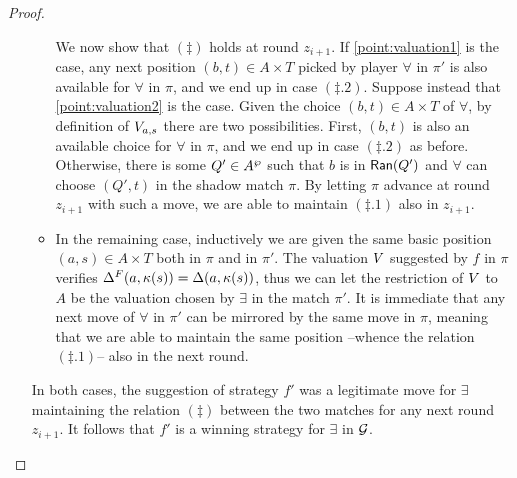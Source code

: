 \begin{proof}
\begin{enumerate}
\begin{itemize}
      We now show that $(\ddag)$ holds at round $z_{i+1}$. If \eqref{point:valuation1} is the case, any next position $(b,t)\in A \times T$ picked by player $\forall$ in $\pi'$ is also available for $\forall$ in $\pi$, and we end up in case $(\ddag .2)$. Suppose instead that \eqref{point:valuation2} is the case. Given the choice $(b,t) \in A \times T$ of $\forall$, by definition of $V_{a,s}$ there are two possibilities. First, $(b,t)$ is also an available choice for $\forall$ in $\pi$, and we end up in case $(\ddag .2)$ as before. Otherwise, there is some $Q' \in A^{\wp}$ such that $b$ is in $\mathsf{Ran}(Q')$ and $\forall$ can choose $(Q',t)$ in the shadow match $\pi$. By letting $\pi$ advance at round $z_{i+1}$ with such a move, we are able to maintain $(\ddag .1)$ also in $z_{i+1}$.
  \item In the remaining case, inductively we are given the same basic position $(a,s) \in A\times T$ both in $\pi$ and in $\pi'$. The valuation $V$ suggested by $f$ in $\pi$ verifies $\Delta^{F}(a,\kappa(s)) = \Delta(a,\kappa(s))$, thus we can let the restriction of $V$ to $A$ be the valuation chosen by $\exists$ in the match $\pi'$. It is immediate that any next move of $\forall$ in $\pi'$ can be mirrored by the same move in $\pi$, meaning that we are able to maintain the same position --whence the relation $(\ddag.1)$-- also in the next round.
\end{itemize}
In both cases, the suggestion of strategy $f'$ was a legitimate move for $\exists$ maintaining the relation $(\ddag)$ between the two matches for any next round $z_{i+1}$. It follows that $f'$ is a winning strategy for $\exists$ in $\mathcal{G}$.
%
      \begin{comment} SHORTER ALTERNATIVE VERSION OF THE PROOF
      The idea is to define a strategy $f'$ for $\exists$ in stages, while playing a match $\pi'$ in $\mathcal{A}(\aut,\model)@(a_I,s_I)$. In parallel to $\pi'$, a shadow match $\pi$ in $\mathcal{A}(\mb{A}^{\f},\model)@(a_I^{\f},s_I)$ is maintained, where $\exists$ plays according to the strategy $f$. Since $f$ is winning and all macro-states from $\shA$ have an odd parity, in finitely many rounds the shadow match $\pi$ reaches a stage where $\mb{A}^{\f}$ enters a state from $A$ and ``behaves as'' $\aut$ for all successive rounds. Thus $\pi$ can be assumed to have the following structure:
       \begin{enumerate}[(I)]
         \item there is an $n$ such that, for each round $z_i$ in the initial segment $z_0,z_1,\dots,z_n$ of $\pi$, a position of the form $(R,s) \in \shA \times T$ is visited and the valuation suggested by $f$ makes the disjunct $\shDe(R,\V(s))$ of $\Delta^{\f}(R,\V(s))$ true in $\R{s}$.

\end{comment}
\end{enumerate}
\end{proof}
